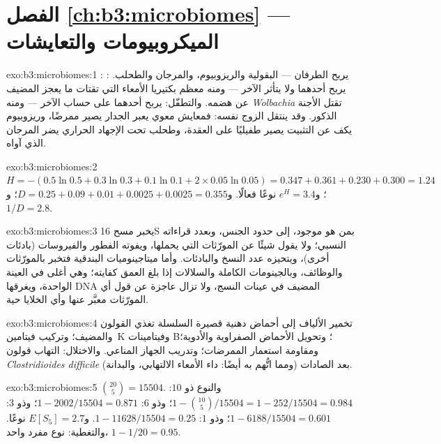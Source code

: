 \section*{الفصل \ref{ch:b3:microbiomes} --- الميكروبيومات والتعايشات}

\begin{solution}{exo:b3:microbiomes:1}
: يربح الطرفان --- البقولية والريزوبيوم، والمرجان
والطحلب. : يربح أحدهما ولا يتأثر الآخر --- ومنه
معظم بكتيريا الأمعاء التي تقتات ما يعجز المضيف عن هضمه.
والتطفّل: يربح أحدهما على حساب الآخر --- ومنه
\emph{Wolbachia} تقتل الأجنة الذكور. وقد ينتقل الزوج نفسه:
فمعايش معوي يعبر الجدار يصير ممرضًا، وريزوبيوم يكف عن
التثبيت يصير طفيليًا على العقدة، وطحلب تحت الإجهاد الحراري
يضر المرجان الذي آواه.
\end{solution}

\begin{solution}{exo:b3:microbiomes:2}
$H = -(0.5\ln 0.5 + 0.3\ln 0.3 + 0.1\ln 0.1 + 2\times 0.05\ln 0.05) =
0.347 + 0.361 + 0.230 + 0.300 = 1.24$؛ و$e^{H} = 3.4$ نوعًا
فعالًا. و$D = 0.25 + 0.09 + 0.01 + 0.0025 + 0.0025 = 0.355$؛
و$1/D =
2.8$.
\end{solution}

\begin{solution}{exo:b3:microbiomes:3}
يخبر مسح 16S بمن هو موجود، إلى حدود الجنس، وبعدد قراءاته
النسبي؛ ولا يقول شيئًا عن المورّثات التي يحملها، ويفوته
الفطور والفيروسات (بادئات أخرى)، ويتحيزه عدد النسخ
والبادئات. وأما ميتاجينوميات البندقية فتخبر بالمورّثات
والوظائف، وبالجينومات الكاملة والسلالات إذا بلغ العمق
كفايته؛ وهي أغلى في العينة الواحدة، ويغرقها DNA المضيف في
عينات النسج، ولا تزال عاجزة عن قول أي المورّثات معبَّر عنها
وأي الخلايا حية.
\end{solution}

\begin{solution}{exo:b3:microbiomes:4}
تخمير الألياف إلى أحماض دهنية قصيرة السلسلة تغذي القولون
والمضيف؛ وتركيب فيتامين~K وفيتامينات B؛ وتحويل الأحماض
الصفراوية والأدوية؛ ومقاومة استعمار الممرضات؛ وتدريب
الجهاز المناعي. والاختلال: التهاب قولون
\emph{Clostridioides difficile} بعد الصادات (ومما اتُّهم به
أيضًا: داء الأمعاء الالتهابي، والبدانة).
\end{solution}

\begin{solution}{exo:b3:microbiomes:5}
$\binom{20}{5} = \num{15504}$. والنوع ذو $10$: $1 - \binom{10}{5}/
\num{15504} = 1 - 252/\num{15504} = 0.984$؛ وذو $6$: $1 - 2002/\num{15504}
= 0.871$؛ وذو $3$: $1 - 6188/\num{15504} = 0.601$؛ وذو $1$: $1 -
\num{11628}/\num{15504} = 0.25$. و$E[S_{5}] = 2.7$ نوعًا. والتغطية:
نوع مفرد واحد، $1 - 1/20 = 0.95$.
\end{solution}

